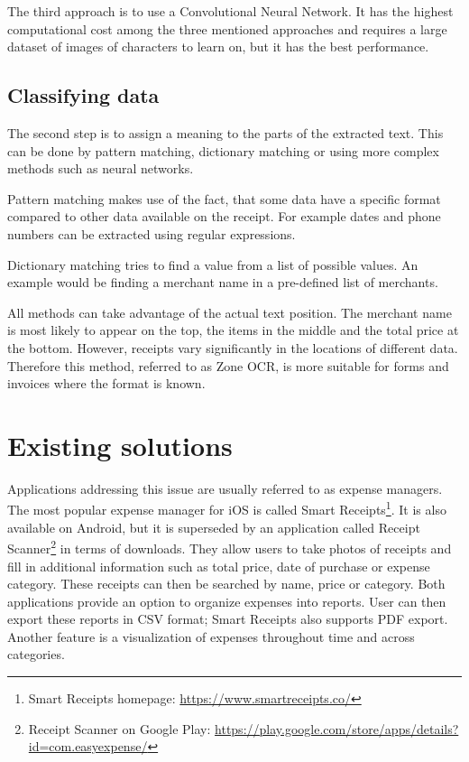 \documentclass[
  digital, %
  table,   %
  oneside, %
  lof,     %
  lot,     %
]{fithesis3}
\begin{document}
The third approach is to use a Convolutional
Neural Network. It has the highest computational cost among the three mentioned approaches and requires a large dataset of images of characters to learn on, but it has the best performance. \cite{OCRCNN}

\section{Classifying data}
The second step is to assign a meaning to the parts of the extracted text. This can be done by pattern matching, dictionary matching or using more complex methods such as neural networks. 

Pattern matching makes use of the fact, that some data have a specific format compared to other data available on the receipt. For example dates and phone numbers can be extracted using regular expressions.

Dictionary matching tries to find a value from a list of possible values. An example would be finding a merchant name in a pre-defined list of merchants.

All methods can take advantage of the actual text position. The merchant name is most likely to appear on the top, the items in the middle and the total price at the bottom. However, receipts vary significantly in the locations of different data. Therefore this method, referred to as Zone OCR, is more suitable for forms and invoices where the format is known.

\chapter{Existing solutions}

Applications addressing this issue are usually referred to as expense managers. The most popular expense manager for iOS is called Smart Receipts\footnote{Smart Receipts homepage: \url{https://www.smartreceipts.co/}}. It is also available on Android, but it is superseded by an application called Receipt Scanner\footnote{Receipt Scanner on Google Play: \url{https://play.google.com/store/apps/details?id=com.easyexpense/}} in terms of downloads. They allow users to take photos of receipts and fill in additional information such as total price, date of purchase or expense category. These receipts can then be searched by name, price or category. Both applications provide an option to organize expenses into reports. User can then export these reports in CSV format; Smart Receipts also supports PDF export. Another feature is a visualization of expenses throughout time and across categories.
\end{document}

